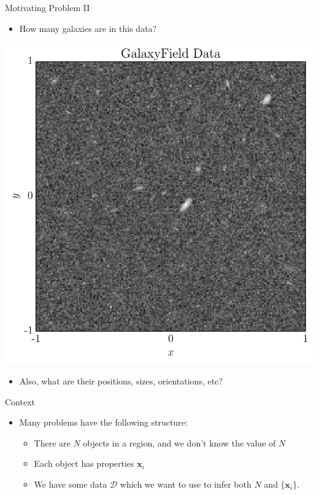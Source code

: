 \begin{frame}[t]{Motivating Problem II}
\begin{itemize}
\item How many galaxies are in this data?
\end{itemize}
\begin{center}
\includegraphics[scale=0.35]{../Paper/galaxyfield_data.pdf}
\end{center}
\begin{itemize}
\item Also, what are their positions, sizes, orientations, etc?
\end{itemize}
\end{frame}


\begin{frame}[t]{Context}
\begin{itemize}
\item Many problems have the following structure:
  \begin{itemize}
  \item There are $N$ objects in a region, and we don't know the value of $N$
  \item Each object has properties $\mathbf{x}_i$
  \item We have some data $\mathcal{D}$ which we want to use to infer both $N$
        and $\{\mathbf{x}_i\}$.
  \end{itemize}
\end{itemize}
\end{frame}



